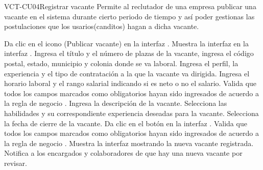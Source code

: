 \clearpage
\begin{UseCase}[]{VCT-CU04}{Registrar vacante}{
	Permite al reclutador de una empresa  publicar una vacante en el sistema durante cierto periodo de tiempo y así poder gestionas las postulaciones 
	que los usarios(canditos) hagan a dicha vacante.
	}
\end{UseCase}

\begin{UCtrayectoria}
	\UCpaso [\UCactor] Da clic en el icono \IUAgregar{} (Publicar vacante) en la interfaz .
	\UCpaso [\UCsist] Muestra la interfaz  en la interfaz .
	\UCpaso [\UCactor] \label{VCT-CU04:vadata} Ingresa el título y el número de plazas de la vacante, ingresa el código postal, estado, municipio y colonia donde se va laboral.
	\UCpaso [\UCactor] Ingresa el perfil, la experiencia y el tipo de contratación a la que la vacante va dirigida.
	\UCpaso [\UCactor] Ingresa el horario laboral y el rango salarial indicando si es neto o no el salario.
	\UCpaso [\UCsist] Valida que todos los campos marcados como obligatorios hayan sido ingresados de acuerdo a la regla de negocio . 
	\UCpaso [\UCactor] Ingresa la descripción de la vacante.
	\UCpaso [\UCactor] \label{VCT-CU04:hab}Selecciona las habilidades y su correspondiente experiencia deseadas para la vacante.
	\UCpaso [\UCactor] Selecciona la fecha de cierre de la vacante.
	\UCpaso [\UCactor] Da clic en el botón  en la interfaz . 
	\UCpaso [\UCsist] \label{VCT-CU04:vadata2}Valida que todos los campos marcados como obligatorios hayan sido ingresados de acuerdo a la regla de negocio .
	\UCpaso [\UCsist] Muestra la interfaz  mostrando la nueva vacante registrada.
	\UCpaso [\UCsist] Notifica a los encargados y colaboradores de que hay una nueva vacante por revisar.
\end{UCtrayectoria}

